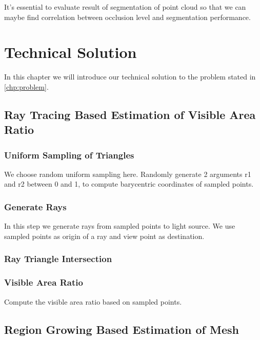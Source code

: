 \documentclass[11pt, a4paper,oneside,chapterprefix=false]{scrbook}
\begin{document}
It's essential to evaluate result of segmentation of point cloud so that we can maybe find correlation between occlusion level and segmentation performance.

\chapter{Technical Solution} \label{chp:solution}

In this chapter we will introduce our technical solution to the problem stated in \ref{chp:problem}.

\section{Ray Tracing Based Estimation of Visible Area Ratio} \label{sec:ray tracing visible area ratio}

\subsection{Uniform Sampling of Triangles}

We choose random uniform sampling here. Randomly generate 2 arguments r1 and r2 between 0 and 1,   to compute barycentric coordinates of sampled points.

\subsection{Generate Rays}

In this step we generate rays from sampled points to light source. We use sampled points as origin of a ray and view point as destination.

\subsection{Ray Triangle Intersection}



\subsection{Visible Area Ratio}

Compute the visible area ratio based on sampled points.

\section{Region Growing Based Estimation of Mesh}
\end{document}
